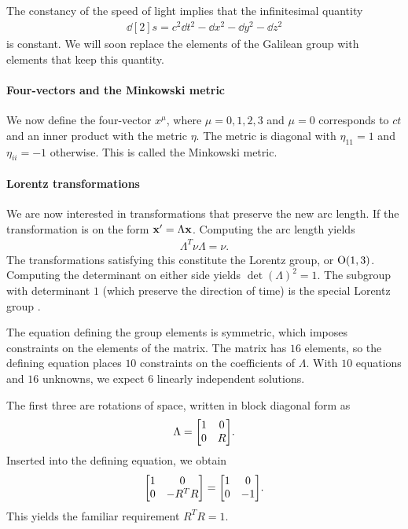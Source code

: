 The constancy of the speed of light implies that the infinitesimal quantity
\begin{align*}
	\dd[2]{s} = c^{2}\dd{t}^{2} - \dd{x}^{2} - \dd{y}^{2} - \dd{z}^{2}
\end{align*}
is constant. We will soon replace the elements of the Galilean group with elements that keep this quantity.

\paragraph{Four-vectors and the Minkowski metric}
We now define the four-vector $x^{\mu}$, where $\mu = 0, 1, 2, 3$ and $\mu = 0$ corresponds to $ct$ and an inner product with the metric $\eta$. The metric is diagonal with $\eta_{11} = 1$ and $\eta_{ii} = -1$ otherwise. This is called the Minkowski metric.

\paragraph{Lorentz transformations}
We are now interested in transformations that preserve the new arc length. If the transformation is on the form $\vb{x}' = \Lambda\vb{x}$. Computing the arc length yields
\begin{align*}
	\Lambda^{T}\nu\Lambda = \nu.
\end{align*}
The transformations satisfying this constitute the Lorentz group, or $\text{O}(1, 3)$. Computing the determinant on either side yields $\det(\Lambda)^{2} = 1$. The subgroup with determinant $1$ (which preserve the direction of time) is the special Lorentz group .

The equation defining the group elements is symmetric, which imposes constraints on the elements of the matrix. The matrix has $16$ elements, so the defining equation places $10$ constraints on the coefficients of $\Lambda$. With $10$ equations and $16$ unknowns, we expect $6$ linearly independent solutions.

The first three are rotations of space, written in block diagonal form as
\begin{align*}
	\Lambda =
	\mqty[
		1 & 0 \\
		0 & R
	].
\end{align*}
Inserted into the defining equation, we obtain
\begin{align*}
	\mqty[
		1 & 0 \\
		0 & -R^{T}R
	] =
	\mqty[
		1 & 0 \\
		0 & -1
	].
\end{align*}
This yields the familiar requirement $R^{T}R = 1$.

